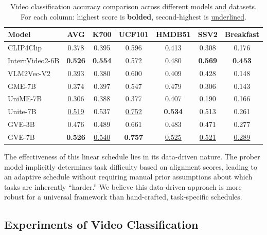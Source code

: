 \begin{table}[t]
\centering
\caption{Video classification accuracy comparison across different models and datasets. For each column: highest score is \textbf{bolded}, second-highest is \underline{underlined}.}
\label{gve:tab:video_classification}
\begin{tabular}{@{}l|>{\columncolor{gray!15}}c|*{5}{c}@{}}
\toprule
\textbf{Model} & \textbf{AVG} & \textbf{K700} & \textbf{UCF101} & \textbf{HMDB51} & \textbf{SSV2} & \textbf{Breakfast} \\
\midrule
CLIP4Clip       & 0.378 & 0.395 & 0.596 & 0.413 & 0.308 & 0.176 \\
InternVideo2-6B & \textbf{0.526} & \textbf{0.554} & 0.572 & 0.480 & \textbf{0.569} & \textbf{0.453} \\
VLM2Vec-V2      & 0.393 & 0.380 & 0.600 & 0.409 & 0.428 & 0.148 \\
GME-7B          & 0.374 & 0.397 & 0.547 & 0.479 & 0.306 & 0.143 \\
UniME-7B        & 0.306 & 0.388 & 0.377 & 0.407 & 0.190 & 0.166 \\
Unite-7B        & \underline{0.519} & 0.537 & \underline{0.752} & \textbf{0.534} & 0.513 & 0.261 \\
\midrule
GVE-3B          & 0.476 & 0.489 & 0.661 & 0.483 & 0.471 & 0.277 \\
GVE-7B          & \textbf{0.526} & \underline{0.540} & \textbf{0.757} & \underline{0.525} & \underline{0.521} & \underline{0.289} \\
\bottomrule
\end{tabular}
\end{table}

The effectiveness of this linear schedule lies in its data-driven nature. The prober model implicitly determines task difficulty based on alignment scores, leading to an adaptive schedule without requiring manual prior assumptions about which tasks are inherently ``harder.'' We believe this data-driven approach is more robust for a universal framework than hand-crafted, task-specific schedules.





\subsection{Experiments of Video Classification}\label{gve:app:video_classification}

